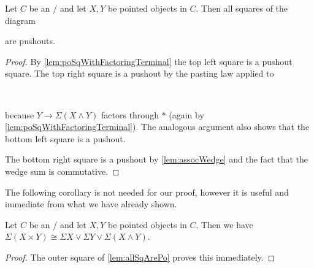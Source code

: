 \begin{lemma}\label{lem:allSqArePo}
    Let $C$ be an \inftytop/ and let $X,Y$ be pointed objects in $C$. 
    Then all squares of the diagram         
    \begin{center} %
    \end{center}
    are pushouts.
    \begin{proof}
        By \cref{lem:poSqWithFactoringTerminal} the top left square is a pushout square.
        The top right square is a pushout by the pasting law applied to
        \begin{center}
            \
        \end{center}
        because $Y\to\Sigma\left(X\wedge Y\right)$ factors through $*$ (again by \cref{lem:poSqWithFactoringTerminal}).
        The analogous argument also shows that the bottom left square is a pushout.

        The bottom right square is a pushout by \cref{lem:assocWedge} and the fact that the wedge sum is commutative.
    \end{proof}
\end{lemma}
The following corollary is not needed for our proof, however it is useful and immediate from what we have already shown.
\begin{corollary}
    Let $C$ be an \inftytop/ and let $X,Y$ be pointed objects in $C$. 
    Then we have $\Sigma\left(X\times Y\right)\cong\Sigma X\vee\Sigma Y\vee\Sigma\left(X\wedge Y\right)$.
    \begin{proof}
        The outer square of \cref{lem:allSqArePo} proves this immediately. 
    \end{proof}
\end{corollary}
